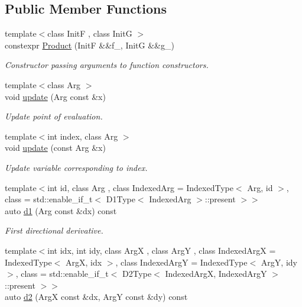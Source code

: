 \subsection*{Public Member Functions}
\begin{DoxyCompactItemize}
\item 
{\footnotesize template$<$class Init\-F , class Init\-G $>$ }\\constexpr \hyperlink{structfuncy_1_1MathematicalOperations_1_1Product_a7697659d9303ee712adf253ff83556fc}{Product} (Init\-F \&\&f\-\_\-, Init\-G \&\&g\-\_\-)
\begin{DoxyCompactList}\small\item\em Constructor passing arguments to function constructors. \end{DoxyCompactList}\item 
{\footnotesize template$<$class Arg $>$ }\\void \hyperlink{structfuncy_1_1MathematicalOperations_1_1Product_abdb90048234c8c97d08987446066633a}{update} (Arg const \&x)
\begin{DoxyCompactList}\small\item\em Update point of evaluation. \end{DoxyCompactList}\item 
{\footnotesize template$<$int index, class Arg $>$ }\\void \hyperlink{structfuncy_1_1MathematicalOperations_1_1Product_aa3743c536918c661d9d80abed3f7bbc6}{update} (const Arg \&x)
\begin{DoxyCompactList}\small\item\em Update variable corresponding to index. \end{DoxyCompactList}\item 
{\footnotesize template$<$int id, class Arg , class Indexed\-Arg  = Indexed\-Type$<$ Arg, id $>$, class  = std\-::enable\-\_\-if\-\_\-t$<$ D1\-Type$<$ Indexed\-Arg $>$\-::present $>$$>$ }\\auto \hyperlink{structfuncy_1_1MathematicalOperations_1_1Product_ad40686330ec5a15af5fc79c5e11d7665}{d1} (Arg const \&dx) const 
\begin{DoxyCompactList}\small\item\em First directional derivative. \end{DoxyCompactList}\item 
{\footnotesize template$<$int idx, int idy, class Arg\-X , class Arg\-Y , class Indexed\-Arg\-X  = Indexed\-Type$<$ Arg\-X, idx $>$, class Indexed\-Arg\-Y  = Indexed\-Type$<$ Arg\-Y, idy $>$, class  = std\-::enable\-\_\-if\-\_\-t$<$ D2\-Type$<$ Indexed\-Arg\-X, Indexed\-Arg\-Y $>$\-::present $>$$>$ }\\auto \hyperlink{structfuncy_1_1MathematicalOperations_1_1Product_a1a926ff06a78022888f3c35ecc2b7077}{d2} (Arg\-X const \&dx, Arg\-Y const \&dy) const 

\end{DoxyCompactItemize}
